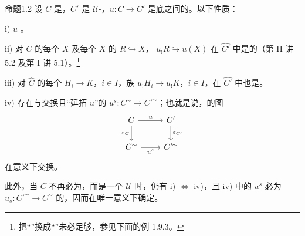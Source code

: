 \begin{SGAresult}{命题}{1.2}
设 $C$ 是，$C'$ 是 $\mathcal U$-，$u:C\to C'$ 是底之间的。以下性质：

\noindent i)  $u$ 。

\noindent ii) 对 $C$ 的每个 $X$ 及每个 $X$ 的 $R\hookrightarrow X$， $u_!R\hookrightarrow u(X)$ 在 $\widehat {C'}$ 中是的（第 II 讲 5.2 及第 I 讲 5.1）。\footnote{把“”换成“”未必足够，参见下面的例 1.9.3。}

\noindent iii) 对 $\widehat C$ 的每个 $H_i\to K$，$i\in I$，族 $u_!H_i\to u_!K$，$i\in I$，在 $\widehat {C'}$ 中也是。

\noindent iv) 存在与交换且“延拓 $u$”的 $u^s:C^{\sim}\to C'^{\sim}$；也就是说，的图
\[
\begin{tikzcd}
 C\arrow[r,"u"]\arrow[d,"\varepsilon_C"'] & C'\arrow[d,"\varepsilon_{C'}"]\\
 C^{\sim}\arrow[r,"u^s"'] & C'^{\sim}
\end{tikzcd}
\]
在意义下交换。

此外，当 $C$ 不再必为，而是一个 $\mathcal U$-时，仍有 i) $\Leftrightarrow$ iv)，且 iv) 中的 $u^s$ 必为 $u_s:C'^{\sim}\to C^{\sim}$ 的，因而在唯一意义下确定。
\end{SGAresult}
